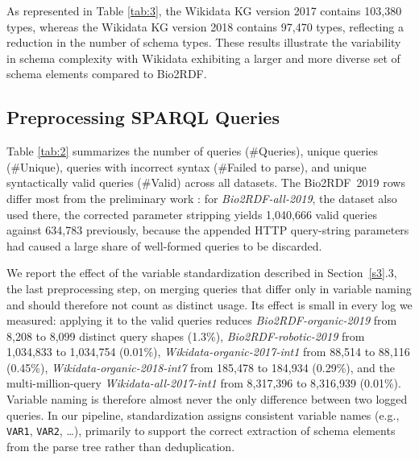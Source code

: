 \documentclass[sw]{iosart2x}
\begin{document}
As represented in Table \ref{tab:3}, the Wikidata KG version 2017 contains 103,380 types, whereas the Wikidata KG version 2018 contains 97,470 types, reflecting a reduction in the number of schema types. These results illustrate the variability in schema complexity with Wikidata exhibiting a larger and more diverse set of schema elements compared to Bio2RDF.
\begin{table}[ht]
\centering
\caption{Total schema elements Statistics per KG version}
\label{tab:3}
\end{table}


\subsection{Preprocessing SPARQL Queries}
Table \ref{tab:2} summarizes the number of queries (\#Queries), unique queries (\#Unique), queries with incorrect syntax (\#Failed to parse), and unique syntactically valid queries (\#Valid) across all datasets. The Bio2RDF~2019 rows differ most from the preliminary work \cite{mohammadi2024analyzing}: for \emph{Bio2RDF-all-2019}, the dataset also used there, the corrected parameter stripping yields 1{,}040{,}666 valid queries against 634{,}783 previously, because the appended HTTP query-string parameters had caused a large share of well-formed queries to be discarded.

We report the effect of the variable standardization described in Section~\ref{s3}.3, the last preprocessing step, on merging queries that differ only in variable naming and should therefore not count as distinct usage. Its effect is small in every log we measured: applying it to the valid queries reduces \emph{Bio2RDF-organic-2019} from 8{,}208 to 8{,}099 distinct query shapes (1.3\%), \emph{Bio2RDF-robotic-2019} from 1{,}034{,}833 to 1{,}034{,}754 (0.01\%), \emph{Wikidata-organic-2017-int1} from 88{,}514 to 88{,}116 (0.45\%), \emph{Wikidata-organic-2018-int7} from 185{,}478 to 184{,}934 (0.29\%), and the multi-million-query \emph{Wikidata-all-2017-int1} from 8{,}317{,}396 to 8{,}316{,}939 (0.01\%). Variable naming is therefore almost never the only difference between two logged queries.  In our pipeline, standardization assigns consistent variable names (e.g., \texttt{VAR1}, \texttt{VAR2}, \ldots), primarily to support the correct extraction of schema elements from the parse tree rather than deduplication.
\end{document}
